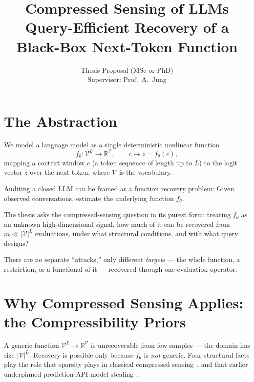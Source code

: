 \documentclass[11pt,a4paper]{article}
\title{\textbf{Compressed Sensing of LLMs}\\[0.3em]
\large Query-Efficient Recovery of a Black-Box Next-Token Function}
\author{Thesis Proposal (MSc or PhD)\\[0.4em]
\normalsize Supervisor: Prof.\ A.\ Jung}
\date{}
\theoremstyle{definition}
\newcommand{\Voc}{\mathcal{V}}
\newcommand{\RR}{\mathbb{R}}
\begin{document}
\maketitle

\section{The Abstraction}

We model a language model as a single deterministic nonlinear function
\[
  f_\theta : \Voc^L \to \RR^{\Voc}, \qquad c \mapsto z = f_\theta(c),
\]
mapping a context window $c$ (a token sequence of length up to $L$) to the logit
vector $z$ over the next token, where $\Voc$ is the vocabulary. 

Auditing a closed LLM can be framed as a function recovery problem: Given observed 
conversations, estimate the underlying function $f_\theta$.

The thesis asks the compressed-sensing question in its purest form: 
treating $f_\theta$ as an unknown high-dimensional signal, how much of 
it can be recovered from $m \ll |\Voc|^L$ evaluations, under what 
structural conditions, and with what query designs?

There are no separate ``attacks,'' only different \emph{targets} --- the whole
function, a restriction, or a functional of it --- recovered through one
evaluation operator.

\section{Why Compressed Sensing Applies: the Compressibility Priors}

A generic function $\Voc^L \to \RR^{\Voc}$ is unrecoverable from few samples ---
the domain has size $|\Voc|^L$. Recovery is possible only because $f_\theta$ is
\emph{not} generic. Four structural facts play the role that sparsity plays in
classical compressed sensing~\citep{candes2005decoding,donoho2006compressed,candestao2006near},
and that earlier underpinned prediction-API model
stealing~\citep{tramer2016stealing}:
\end{document}
